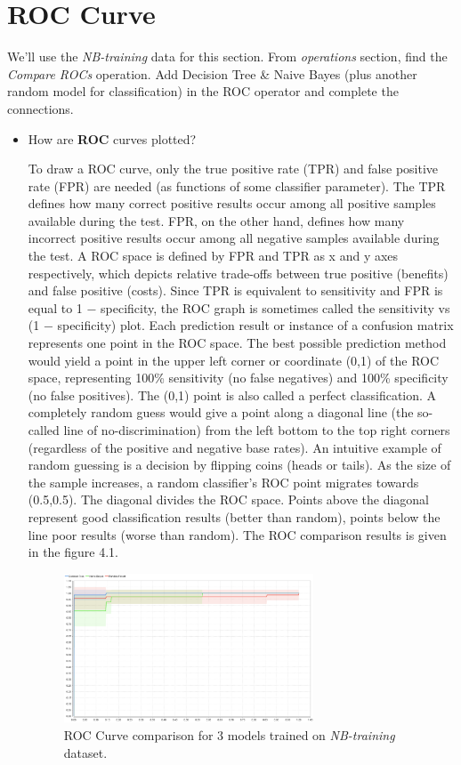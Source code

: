\documentclass[12pt]{article}
\numberwithin{equation}{section}
\numberwithin{table}{section}
\numberwithin{figure}{section}
\begin{document}
\section{ROC Curve}
We'll use the \textit{NB-training} data for this section. From \textit{operations} section, find the \textit{Compare ROCs} operation. Add Decision Tree \& Naive Bayes (plus another random model for classification) in the ROC operator and complete the connections.
\begin{itemize}
	\item How are \textbf{ROC} curves plotted?
	
	To draw a ROC curve, only the true positive rate (TPR) and false positive rate (FPR) are needed (as functions of some classifier parameter). The TPR defines how many correct positive results occur among all positive samples available during the test. FPR, on the other hand, defines how many incorrect positive results occur among all negative samples available during the test.
	A ROC space is defined by FPR and TPR as x and y axes respectively, which depicts relative trade-offs between true positive (benefits) and false positive (costs). Since TPR is equivalent to sensitivity and FPR is equal to 1 − specificity, the ROC graph is sometimes called the sensitivity vs (1 − specificity) plot. Each prediction result or instance of a confusion matrix represents one point in the ROC space.
	The best possible prediction method would yield a point in the upper left corner or coordinate (0,1) of the ROC space, representing 100\% sensitivity (no false negatives) and 100\% specificity (no false positives). The (0,1) point is also called a perfect classification. A completely random guess would give a point along a diagonal line (the so-called line of no-discrimination) from the left bottom to the top right corners (regardless of the positive and negative base rates). An intuitive example of random guessing is a decision by flipping coins (heads or tails). As the size of the sample increases, a random classifier's ROC point migrates towards (0.5,0.5).
	The diagonal divides the ROC space. Points above the diagonal represent good classification results (better than random), points below the line poor results (worse than random). The ROC comparison results is given in the figure 4.1.
	
	\begin{figure}[!h]\centering
		\includegraphics[width=0.7\textwidth]{roc.png}
		\caption{ROC Curve comparison for 3 models trained on \textit{NB-training} dataset.}
		\label{pl1} 
	\end{figure}



\end{itemize}
\end{document}
